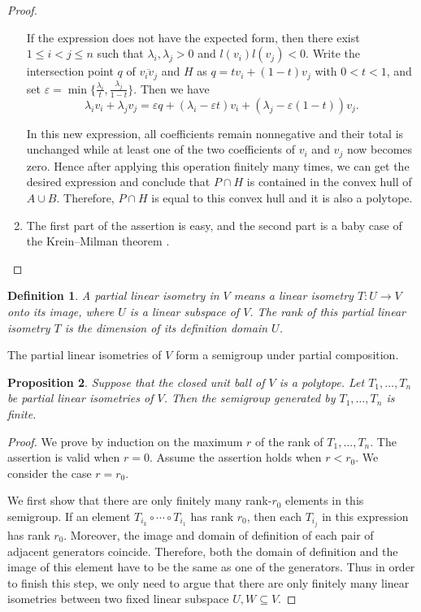\documentclass[12pt]{article}
\newtheorem{definition}{Definition}[section]
\newtheorem{proposition}[definition]{Proposition}
\begin{document}
\begin{spacing}{1.25}
\begin{proof}
\begin{enumerate}
If the expression does not have the expected form, then there exist $1\leq i<j\leq n$ such that $\lambda_i,\lambda_j>0$ and $l(v_i)l(v_j)<0$. Write the intersection point $q$ of $\overline{v_iv_j}$ and $H$ as $q=tv_i+(1-t)v_j$ with $0<t<1$, and set $\varepsilon=\min\{\frac{\lambda_i}{t},\frac{\lambda_j}{1-t}\}$. Then we have
$$
\lambda_iv_i+\lambda_jv_j=\varepsilon q+(\lambda_i-\varepsilon t)v_i+(\lambda_j-\varepsilon(1-t))v_j.
$$

In this new expression, all coefficients remain nonnegative and their total is unchanged while at least one of the two coefficients of $v_i$ and $v_j$ now becomes zero. Hence after applying this operation finitely many times, we can get the desired expression and conclude that $P\cap H$ is contained in the convex hull of $A\cup B$. Therefore, $P\cap H$ is equal to this convex hull and it is also a polytope.

\item
The first part of the assertion is easy, and the second part is a baby case of the Krein--Milman theorem \cite[Theorem 3.23]{Rud91}.
\end{enumerate}
\end{proof}

\begin{definition}\label{parlinisom}
A \emph{partial linear isometry} in $V$ means a linear isometry $T\colon U\to V$ onto its image, where $U$ is a linear subspace of $V$. The \emph{rank} of this partial linear isometry $T$ is the dimension of its definition domain $U$.
\end{definition}

The partial linear isometries of $V$ form a semigroup under partial composition.

\begin{proposition}\label{linlem}
Suppose that the closed unit ball of $V$ is a polytope. Let $T_1,\dots,T_n$ be partial linear isometries of $V$. Then the semigroup generated by $T_1,\dots,T_n$ is finite.
\end{proposition}

\begin{proof}
We prove by induction on the maximum $r$ of the rank of $T_1,\dots,T_n$. The assertion is valid when $r=0$. Assume the assertion holds when $r<r_0$. We consider the case $r=r_0$.

We first show that there are only finitely many rank-$r_0$ elements in this semigroup. If an element $T_{i_k}\circ\cdots\circ T_{i_1}$ has rank $r_0$, then each $T_{i_j}$ in this expression has rank $r_0$. Moreover, the image and domain of definition of each pair of adjacent generators coincide. Therefore, both the domain of definition and the image of this element have to be the same as one of the generators. Thus in order to finish this step, we only need to argue that there are only finitely many linear isometries between two fixed linear subspace $U,W\subseteq V$.


\end{proof}
\end{spacing}
\end{document}
